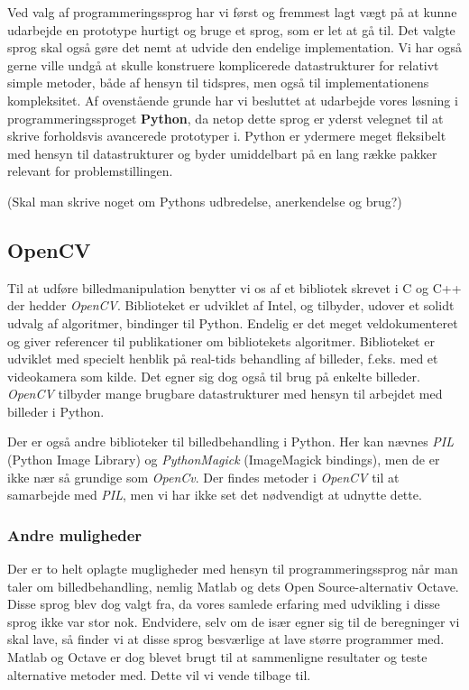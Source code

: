 {
Ved valg af programmeringssprog har vi først og fremmest lagt vægt på at
kunne udarbejde en prototype hurtigt og bruge et sprog, som er let at gå
til. Det valgte sprog skal også gøre det nemt at udvide den endelige
implementation. Vi har også gerne ville undgå at skulle konstruere
komplicerede datastrukturer for relativt simple metoder, både af hensyn
til tidspres, men også til implementationens kompleksitet. Af
ovenstående grunde har vi besluttet at udarbejde vores løsning i
programmeringssproget \textbf{Python}, da netop dette sprog er yderst
velegnet til at skrive forholdsvis avancerede prototyper i. Python er
ydermere meget fleksibelt med hensyn til datastrukturer og byder
umiddelbart på en lang række pakker relevant for problemstillingen.

(Skal man skrive noget om Pythons udbredelse, anerkendelse og brug?)

\subsection{OpenCV}
Til at udføre billedmanipulation benytter vi os af et bibliotek skrevet
i C og C++ der hedder \emph{OpenCV}. Biblioteket er udviklet af Intel,
og tilbyder, udover et solidt udvalg af algoritmer, bindinger til
Python.  Endelig er det meget veldokumenteret og giver referencer til
publikationer om bibliotekets algoritmer. Biblioteket er udviklet med
specielt henblik på real-tids behandling af billeder, f.eks. med et
videokamera som kilde. Det egner sig dog også til brug på enkelte
billeder.  \emph{OpenCV} tilbyder mange brugbare datastrukturer med
hensyn til arbejdet med billeder i Python.

Der er også andre biblioteker til billedbehandling i Python. Her kan
nævnes \emph{PIL} (Python Image Library) og \emph{PythonMagick}
(ImageMagick bindings), men de er ikke nær så grundige som
\emph{OpenCv}. Der findes metoder i \emph{OpenCV} til at samarbejde med
\emph{PIL}, men vi har ikke set det nødvendigt at udnytte dette.

\subsubsection{Andre muligheder}
Der er to helt oplagte mugligheder med hensyn til programmeringssprog
når man taler om billedbehandling, nemlig Matlab og dets Open
Source-alternativ Octave. Disse sprog blev dog valgt fra, da vores
samlede erfaring med udvikling i disse sprog ikke var stor nok.
Endvidere, selv om de især egner sig til de beregninger vi skal lave, så
finder vi at disse sprog besværlige at lave større programmer med.
Matlab og Octave er dog blevet brugt til at sammenligne resultater og
teste alternative metoder med. Dette vil vi vende tilbage til.

}
